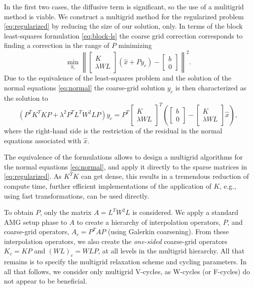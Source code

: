 In the first two cases, the diffusive term is significant, so the use
of a mulitigrid method is viable. We construct a multigrid method for
the regularized problem \eqref{eq:regularized} by reducing the size of
our solution, only. In terms of the block least-squares formulation
\eqref{eq:block-ls} the coarse grid correction corresponds to finding
a correction in the range of $P$ minimizing
\[
\min_{y_c}\left\| \left[\begin{array}{c} K \\ \lambda
      WL\end{array}\right](\hat{x}+Py_c) - \left[\begin{array}{c} b \\ 0 \end{array}\right]\right\|^2.
\]
Due to the equivalence of the least-squares problem and the solution
of the normal equations \eqref{eq:normal} the coarse-grid solution $y_c$ is then characterized as the solution to
\[
\left(P^TK^TKP + \lambda^2P^TL^TW^2LP\right)y_c =
P^T\left[\begin{array}{c} K \\ \lambda WL\end{array}\right]^T
\left(\left[\begin{array}{c} b \\ 0 \end{array}\right] - \left[\begin{array}{c} K \\ \lambda
      WL\end{array}\right]\hat{x}\right),
\]
where the right-hand side is the restriction of the residual in the
normal equations associated with $\hat{x}$.

The equivalence of the formulations allows to design a multigrid
algorithms for the normal equations \eqref{eq:normal}, and apply it
directly to the sparse matrices in \eqref{eq:regularized}. As $K^TK$
can get dense, this results in a tremendous reduction of compute time,
further efficient implementations of the application of $K$, e.g.,
using fast transformations, can be used directly.

To obtain $P$, only the matrix $A = L^T W^2 L$ is considered. We apply a
standard AMG setup phase to $A$ to create a hierarchy of interpolation
operators, $P$, and coarse-grid operators, $A_c = P^TAP$ (using
Galerkin coarsening).  From these interpolation operators, we also
create the \textit{one-sided} coarse-grid operators $K_c = KP$ and $(WL)_c =
WLP$, at all levels in the multigrid hierarchy. All that remains is to
specify the multigrid relaxation scheme and cycling parameters.  In
all that follows, we consider only multigrid V-cycles, as W-cycles (or
F-cycles) do not appear to be beneficial.

